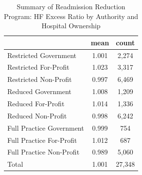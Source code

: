 \begin{table}[htbp]\centering
\def\sym#1{\ifmmode^{#1}\else\(^{#1}\)\fi}
\caption{Summary of Readmission Reduction Program: HF Excess Ratio by Authority and Hospital Ownership}
\begin{tabular}{l*{1}{cc}}
\toprule
                    &        mean&       count\\
\midrule
Restricted Government&       1.001&       2,274\\
Restricted For-Profit&       1.023&       3,317\\
Restricted Non-Profit&       0.997&       6,469\\
Reduced Government  &       1.008&       1,209\\
Reduced For-Profit  &       1.014&       1,336\\
Reduced Non-Profit  &       0.998&       6,242\\
Full Practice Government&       0.999&         754\\
Full Practice For-Profit&       1.012&         687\\
Full Practice Non-Profit&       0.989&       5,060\\
Total               &       1.001&      27,348\\
\bottomrule
\end{tabular}
\end{table}

